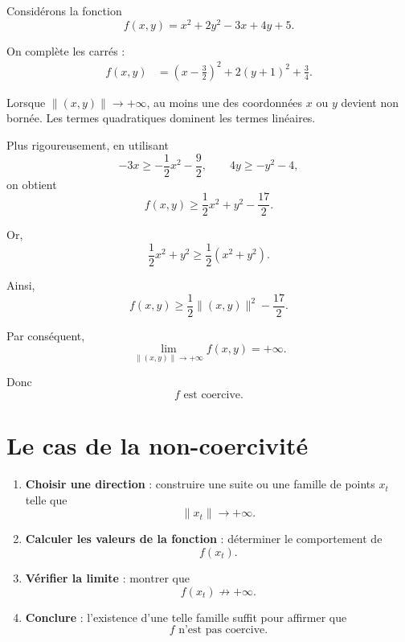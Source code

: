 \begin{exemple}
Considérons la fonction
\[
f(x,y)=x^2+2y^2-3x+4y+5.
\]

On complète les carrés :
\[
\begin{aligned}
f(x,y)
&=\left(x-\frac32\right)^2
+2(y+1)^2+\frac34.
\end{aligned}
\]

Lorsque $\|(x,y)\|\to+\infty$, au moins une des coordonnées $x$ ou $y$ devient non bornée. Les termes quadratiques dominent les termes linéaires.

Plus rigoureusement, en utilisant
\[
-3x\geq -\frac12x^2-\frac92,
\qquad
4y\geq -y^2-4,
\]
on obtient
\[
f(x,y)\geq
\frac12x^2+y^2-\frac{17}{2}.
\]

Or,
\[
\frac12x^2+y^2
\geq\frac12(x^2+y^2).
\]

Ainsi,
\[
f(x,y)\geq
\frac12\|(x,y)\|^2-\frac{17}{2}.
\]

Par conséquent,
\[
\lim_{\|(x,y)\|\to+\infty}f(x,y)=+\infty.
\]

Donc
\[
\boxed{f\text{ est coercive}.}
\]
\end{exemple}

\section{Le cas de la non-coercivité}

\begin{methode}
\begin{enumerate}[label=\textbf{Étape \arabic*.}]
    \item \textbf{Choisir une direction} : construire une suite ou une famille de points $x_t$ telle que
    \[
    \|x_t\|\longrightarrow+\infty.
    \]

    \item \textbf{Calculer les valeurs de la fonction} : déterminer le comportement de
    \[
    f(x_t).
    \]

    \item \textbf{Vérifier la limite} : montrer que
    \[
    f(x_t)\not\longrightarrow+\infty.
    \]

    \item \textbf{Conclure} : l'existence d'une telle famille suffit pour affirmer que
    \[
    \boxed{f\text{ n'est pas coercive}.}
    \]
\end{enumerate}
\end{methode}

